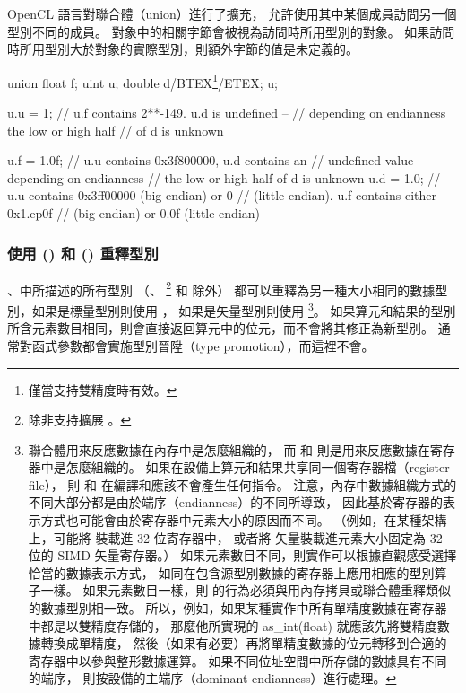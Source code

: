 OpenCL 語言對聯合體（union）進行了擴充，
允許使用其中某個成員訪問另一個型別不同的成員。
對象中的相關字節會被視為訪問時所用型別的對象。
如果訪問時所用型別大於對象的實際型別，則額外字節的值是未定義的。

\startexample
\startclc
union{ float f; uint u; double d/BTEX\footnote{僅當支持雙精度時有效。}/ETEX;} u;

u.u = 1;	// u.f contains 2**-149. u.d is undefined --
		// depending on endianness the low or high half
		// of d is unknown

u.f = 1.0f;	// u.u contains 0x3f800000, u.d contains an
		// undefined value -- depending on endianness
		// the low or high half of d is unknown
u.d = 1.0;	// u.u contains 0x3ff00000 (big endian) or 0
		// (little endian). u.f contains either 0x1.ep0f
		// (big endian) or 0.0f (little endian)
\stopclc
\stopexample

\subsubsection{使用 () 和 () 重釋型別}

、中所描述的所有型別
（、 
\footnote{除非支持擴展 。} 和  除外）
都可以重釋為另一種大小相同的數據型別，如果是標量型別則使用 ，
如果是矢量型別則使用 \footnote{
聯合體用來反應數據在內存中是怎麼組織的，
而  和  則是用來反應數據在寄存器中是怎麼組織的。
如果在設備上算元和結果共享同一個寄存器檔（register file），
則  和  在編譯和應該不會產生任何指令。
注意，內存中數據組織方式的不同大部分都是由於端序（endianness）的不同所導致，
因此基於寄存器的表示方式也可能會由於寄存器中元素大小的原因而不同。
（例如，在某種架構上，可能將  裝載進 32 位寄存器中，
或者將  矢量裝載進元素大小固定為 32 位的 SIMD 矢量寄存器。）
如果元素數目不同，則實作可以根據直觀感受選擇恰當的數據表示方式，
如同在包含源型別數據的寄存器上應用相應的型別算子一樣。
如果元素數目一樣，則  的行為必須與用內存拷貝或聯合體重釋類似的數據型別相一致。
所以，例如，如果某種實作中所有單精度數據在寄存器中都是以雙精度存儲的，
那麼他所實現的 as_int(float) 就應該先將雙精度數據轉換成單精度，
然後（如果有必要）再將單精度數據的位元轉移到合適的寄存器中以參與整形數據運算。
如果不同位址空間中所存儲的數據具有不同的端序，
則按設備的主端序（dominant endianness）進行處理。
}。
如果算元和結果的型別所含元素數目相同，則會直接返回算元中的位元，而不會將其修正為新型別。
通常對函式參數都會實施型別晉陞（type promotion），而這裡不會。

